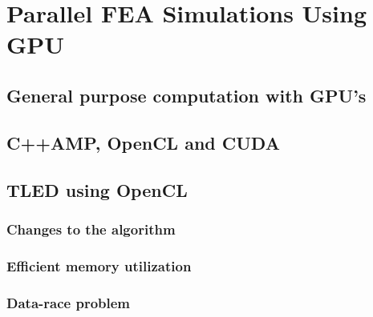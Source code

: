 \section{Parallel FEA Simulations Using GPU }\label{work-overview}

\subsection{General purpose computation with GPU's}

\subsection{C++AMP, OpenCL and CUDA}

\subsection{TLED using OpenCL}
  \subsubsection{Changes to the algorithm}

  \subsubsection{Efficient memory utilization}

  \subsubsection{Data-race problem}
